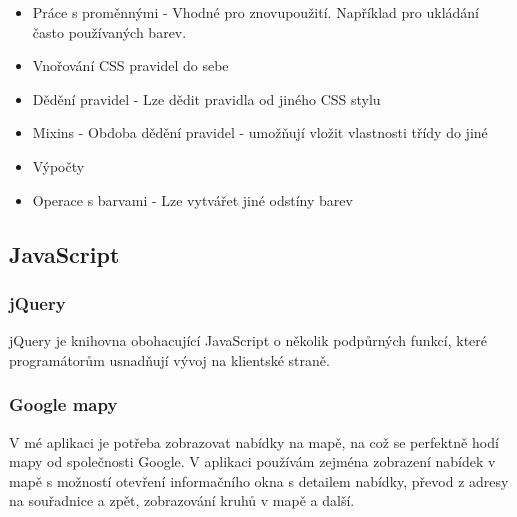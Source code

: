 \begin{itemize}
    \item Práce s proměnnými - Vhodné pro znovupoužití. Například pro ukládání často používaných barev.
	\item Vnořování CSS pravidel do sebe
	\item Dědění pravidel - Lze dědit pravidla od jiného CSS stylu
	\item Mixins - Obdoba dědění pravidel - umožňují vložit vlastnosti třídy do jiné
	\item Výpočty
	\item Operace s barvami - Lze vytvářet jiné odstíny barev
\end{itemize}

\subsection{JavaScript}

\subsubsection{jQuery}
jQuery je knihovna obohacující JavaScript o několik podpůrných funkcí, které programátorům usnadňují vývoj na klientské straně.

\subsubsection{Google mapy}
V mé aplikaci je potřeba zobrazovat nabídky na mapě, na což se perfektně hodí mapy od společnosti Google. V aplikaci používám zejména zobrazení nabídek v mapě s možností otevření informačního okna s detailem nabídky, převod z adresy na souřadnice a zpět, zobrazování kruhů v mapě a další.